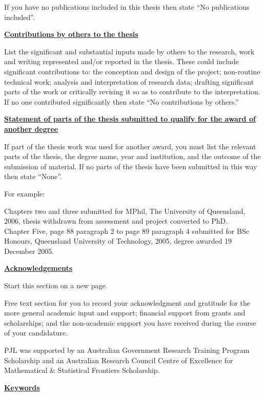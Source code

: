 If you have no publications included in this thesis then state ``No
publications included''.

\newpage

{\bf \underline{Contributions by others to the thesis}}

List the significant and substantial inputs made by others to the research,
work and writing represented and/or reported in the thesis. These could include
significant contributions to: the conception and design of the project;
non-routine technical work; analysis and interpretation of research data;
drafting significant parts of the work or critically revising it so as to
contribute to the interpretation. If no one contributed significantly then
state ``No contributions by others.''

{\bf \underline{Statement of parts of the thesis submitted to qualify for
the award of} \\
  \underline{another degree}}

If part of the thesis work was used for another award, you must list the
relevant parts of the thesis, the degree name, year and institution, and the
outcome of the submission of material. If no parts of the thesis have been
submitted in this way then state ``None''.

For example:

Chapters two and three submitted for MPhil, The University of Queensland, 2006,
thesis withdrawn from assessment and project converted to PhD. \\
Chapter Five, page 88 paragraph 2 to page 89 paragraph 4 submitted for BSc
Honours, Queensland University of Technology, 2005, degree awarded 19 December
2005.

\newpage

{\bf \underline{Acknowledgements}}

Start this section on a new page.

Free text section for you to record your acknowledgment and gratitude for the
more general academic input and support; financial support from grants and
scholarships; and the non-academic support you have received during the course
of your candidature.

PJL was supported by an Australian Government Research Training Program Scholarship and an Australian Research Council Centre of Excellence for Mathematical \& Statistical Frontiers Scholarship.


\newpage

{\bf \underline{Keywords}}

